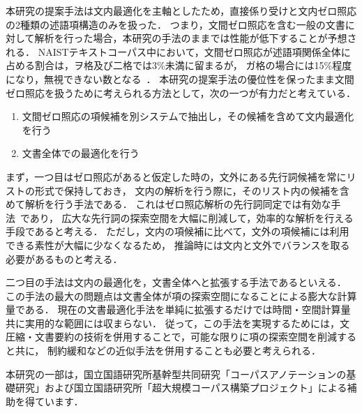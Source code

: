 \documentclass[japanese]{jnlp_1.4}
\begin{document}
本研究の提案手法は文内最適化を主軸としたため，直接係り受けと文内ゼロ照応の2種類の述語項構造のみを扱った．
つまり，文間ゼロ照応を含む一般の文書に対して解析を行った場合，本研究の手法のままでは性能が低下することが予想される．
NAISTテキストコーパス中において，文間ゼロ照応が述語項関係全体に占める割合は，ヲ格及び二格では3\%未満に留まるが，
ガ格の場合には15\%程度になり，無視できない数となる~\cite{iida:2007:law}．
本研究の提案手法の優位性を保ったまま文間ゼロ照応を扱うために考えられる方法として，次の一つが有力だと考えている．
\begin{enumerate}
\item 文間ゼロ照応の項候補を別システムで抽出し，その候補を含めて文内最適化を行う
\item 文書全体での最適化を行う
\end{enumerate}
まず，一つ目はゼロ照応があると仮定した時の，文外にある先行詞候補を常にリストの形式で保持しておき，
文内の解析を行う際に，そのリスト内の候補を含めて解析を行う手法である．
これはゼロ照応解析の先行詞同定では有効な手法~\cite{iida:2009:acl}であり，
広大な先行詞の探索空間を大幅に削減して，効率的な解析を行える手段であると考える．
ただし，文内の項候補に比べて，文外の項候補には利用できる素性が大幅に少なくなるため，
推論時には文内と文外でバランスを取る必要があるものと考える．

二つ目の手法は文内の最適化を，文書全体へと拡張する手法であるといえる．
この手法の最大の問題点は文書全体が項の探索空間になることによる膨大な計算量である．
現在の文書最適化手法を単純に拡張するだけでは時間・空間計算量共に実用的な範囲には収まらない．
従って，この手法を実現するためには，文圧縮・文書要約の技術を併用することで，可能な限りに項の探索空間を削減すると共に，
制約緩和などの近似手法を併用することも必要と考えられる．


\acknowledgment
 本研究の一部は，国立国語研究所基幹型共同研究「コーパスアノテーションの基礎研究」および国立国語研究所「超大規模コーパス構築プロジェクト」による補助を得ています．
\end{document}
